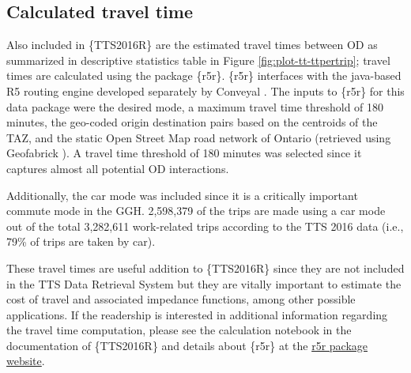 \documentclass[Royal,times,sageh]{sagej}
\begin{document}
\hypertarget{calculated-travel-time}{%
\subsection{Calculated travel time}\label{calculated-travel-time}}

Also included in \{TTS2016R\} are the estimated travel times between OD
as summarized in descriptive statistics table in Figure
\ref{fig:plot-tt-ttpertrip}; travel times are calculated using the
package \{r5r\}. \{r5r\} interfaces with the java-based R5 routing
engine developed separately by Conveyal
\citep{conveyalConveyalR5Routing2022}. The inputs to \{r5r\} for this
data package were the desired mode, a maximum travel time threshold of
180 minutes, the geo-coded origin destination pairs based on the
centroids of the TAZ, and the static Open Street Map road network of
Ontario (retrieved using Geofabrick
\citep{geofabrikOntarioOpenStreetMapGeofabrik2022}). A travel time
threshold of 180 minutes was selected since it captures almost all
potential OD interactions.

Additionally, the car mode was included since it is a critically
important commute mode in the GGH. 2,598,379 of the trips are made using
a car mode out of the total 3,282,611 work-related trips according to
the TTS 2016 data (i.e., 79\% of trips are taken by car).

These travel times are useful addition to \{TTS2016R\} since they are
not included in the TTS Data Retrieval System but they are vitally
important to estimate the cost of travel and associated impedance
functions, among other possible applications. If the readership is
interested in additional information regarding the travel time
computation, please see the calculation notebook in the documentation of
\{TTS2016R\} and details about \{r5r\} at the
\href{https://ipeagit.github.io/r5r/index.html}{r5r package website}.
\end{document}
